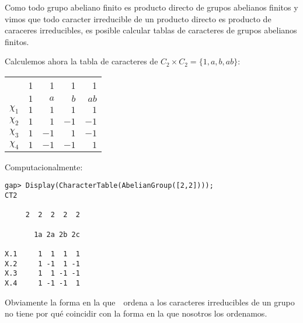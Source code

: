 

Como todo grupo abeliano finito es producto directo de grupos abelianos finitos 
y vimos que todo caracter irreducible de un producto directo es producto de caraceres irreducibles, 
es posible calcular tablas de caracteres de grupos abelianos finitos. 

\begin{example}
	Calculemos ahora la tabla de caracteres de $C_2\times C_2=\{1,a,b,ab\}$:
	\begin{center}
		\begin{tabular}{|c|rrrr|}
			\hline 
			& 1 & 1 & 1 & 1\tabularnewline
			& $1$ & $a$ & $b$ & $ab$\tabularnewline
			\hline 
			$\chi_{1}$ & $1$ & $1$ & $1$ & $1$\tabularnewline
			$\chi_{2}$ & $1$ & $1$ & $-1$ & $-1$\tabularnewline
			$\chi_{3}$ & $1$ & $-1$ & $1$ & $-1$\tabularnewline
			$\chi_{4}$ & $1$ & $-1$ & $-1$ & $1$\tabularnewline
			\hline
		\end{tabular}
	\end{center}
	Computacionalmente:
\begin{lstlisting}
gap> Display(CharacterTable(AbelianGroup([2,2])));
CT2

     2  2  2  2  2

       1a 2a 2b 2c

X.1     1  1  1  1
X.2     1 -1  1 -1
X.3     1  1 -1 -1
X.4     1 -1 -1  1
\end{lstlisting}
Obviamente la forma en la que~\GAP~ordena a los caracteres irreducibles de un grupo 
no tiene por qué coincidir con la forma en la que nosotros los ordenamos. 
\end{example}

